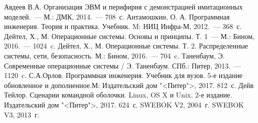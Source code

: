 \begin{thebibliography}{00}
	\bibitem{} Авдеев В.А. Организация ЭВМ и перифирия с демонстрацией
		имитационных моделей.~--- М.: ДМК, 2014.~--- 708~с.
	\bibitem{} Антамошкин, О. А. Программная инженерия. Теория и практика.
		Учебник. M: НИЦ Инфра-М, 2012.~--- 368~с.
	\bibitem{} Дейтел, Х., М. Операционные системы.
		Основы и принципы. Т. 1~--- М.: Бином, 2016.~--- 1024~c.
	\bibitem{} Дейтел, Х., М. Операционные системы. Т. 2.
		Распределенные системы, сети, безопасность. М.: Бином, 2016.~--- 704~c.
	\bibitem{} Таненбаум, Э. Современные операционные системы
		/ Э. Таненбаум. СПб.: Питер, 2013.~--- 1120~c.
	\bibitem{} С.А.Орлов. Программная инженерия.
		Учебник для вузов. 5-е издание обновленное и дополненное.М:
		Издательский дом "<Питер">, 2017. 812~с.
	\bibitem{} Дейв Тейлор. Сценарии командной оболочки.
		Linux, OS X и Unix. 2-е издание.
		Издательский дом "<Питер">, 2017. 624~с.
	\bibitem{} SWEBOK V2, 2004~г.
	\bibitem{} SWEBOK V3, 2013~г.
\end{thebibliography}

